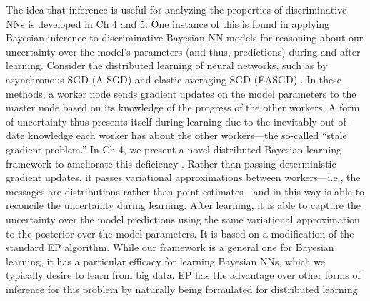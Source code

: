 The idea that inference is useful for analyzing the properties of discriminative NNs is developed in Ch 4 and 5. One instance of this is found in applying Bayesian inference to discriminative Bayesian NN models for reasoning about our uncertainty over the model's parameters (and thus, predictions) during and after learning. Consider the distributed learning of neural networks, such as by asynchronous SGD (A-SGD) \citep{DeanEtAl2012} and elastic averaging SGD (EASGD) \citep{ZhangEtAl2014}. In these methods, a worker node sends gradient updates on the model parameters to the master node based on its knowledge of the progress of the other workers. A form of uncertainty thus presents itself during learning due to the inevitably out-of-date knowledge each worker has about the other workers---the so-called ``stale gradient problem.'' In Ch 4, we present a novel distributed Bayesian learning framework to ameliorate this deficiency \citep{HasencleverWebb2016}. Rather than passing deterministic gradient updates, it passes variational approximations between workers---i.e., the messages are distributions rather than point estimates---and in this way is able to reconcile the uncertainty during learning. After learning, it is able to capture the uncertainty over the model predictions using the same variational approximation to the posterior over the model parameters. It is based on a modification of the standard EP \citep{GelmanEtAl2014} algorithm. While our framework is a general one for Bayesian learning, it has a particular efficacy for learning Bayesian NNs, which we typically desire to learn from big data. EP has the advantage over other forms of inference for this problem by naturally being formulated for distributed learning.

